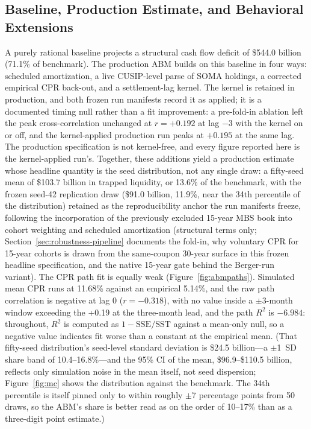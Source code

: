 \documentclass[12pt]{article}
\begin{document}
\subsection{Baseline, Production Estimate, and Behavioral Extensions}\label{sec:abm-results}

A purely rational baseline projects a structural cash flow deficit of \$544.0 billion (71.1\% of benchmark). The production ABM builds on this baseline in four ways: scheduled amortization, a live CUSIP-level parse of SOMA holdings, a corrected empirical CPR back-out, and a settlement-lag kernel. The kernel is retained in production, and both frozen run manifests record it as applied; it is a documented timing null rather than a fit improvement: a pre-fold-in ablation left the peak cross-correlation unchanged at $r = +0.192$ at lag $-3$ with the kernel on or off, and the kernel-applied production run peaks at $+0.195$ at the same lag. The production specification is not kernel-free, and every figure reported here is the kernel-applied run's. Together, these additions yield a production estimate whose headline quantity is the seed distribution, not any single draw: a fifty-seed mean of \$103.7 billion in trapped liquidity, or 13.6\% of the benchmark, with the frozen seed-42 replication draw (\$91.0 billion, 11.9\%, near the 34th percentile of the distribution) retained as the reproducibility anchor the run manifests freeze, following the incorporation of the previously excluded 15-year MBS book into cohort weighting and scheduled amortization (structural terms only; Section~\ref{sec:robustness-pipeline} documents the fold-in, why voluntary CPR for 15-year cohorts is drawn from the same-coupon 30-year surface in this frozen headline specification, and the native 15-year gate behind the Berger-run variant). The CPR path fit is equally weak (Figure~\ref{fig:abmpaths}). Simulated mean CPR runs at 11.68\% against an empirical 5.14\%, and the raw path correlation is negative at lag 0 ($r = -0.318$), with no value inside a $\pm$3-month window exceeding the +0.19 at the three-month lead, and the path $R^2$ is $-6.984$: throughout, $R^2$ is computed as $1-\mathrm{SSE}/\mathrm{SST}$ against a mean-only null, so a negative value indicates fit worse than a constant at the empirical mean. (That fifty-seed distribution's seed-level standard deviation is \$24.5 billion---a $\pm$1~SD share band of 10.4--16.8\%---and the 95\% CI of the mean, \$96.9--\$110.5 billion, reflects only simulation noise in the mean itself, not seed dispersion; Figure~\ref{fig:mc} shows the distribution against the benchmark. The 34th percentile is itself pinned only to within roughly $\pm$7 percentage points from 50 draws, so the ABM's share is better read as on the order of 10--17\% than as a three-digit point estimate.)
\end{document}
